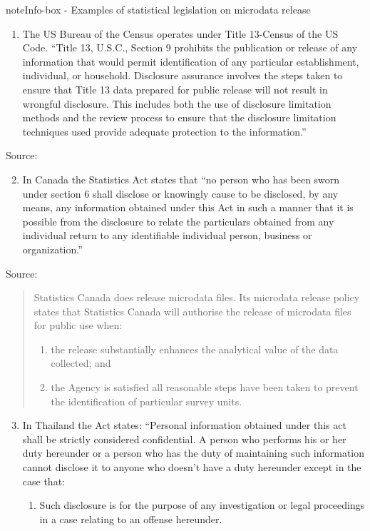 \documentclass[letterpaper,10pt,english]{sphinxmanual}
\begin{document}
\begin{sphinxadmonition}{note}{Info-box - Examples of statistical legislation on microdata release}
\begin{enumerate}
\item {} 
The US Bureau of the Census operates under Title 13-Census of the US Code. “Title 13, U.S.C., Section 9 prohibits the publication or release of any information that would permit identification of any particular establishment, individual, or household. Disclosure assurance involves the steps taken to ensure that Title 13 data prepared for public release will not result in wrongful disclosure. This includes both the use of disclosure limitation methods and the review process to ensure that the disclosure limitation techniques used provide adequate protection to the information.”

\end{enumerate}

Source: 
\begin{enumerate}
\setcounter{enumi}{1}
\item {} 
In Canada the Statistics Act states that “no person who has been sworn under section 6 shall disclose or knowingly cause to be disclosed, by any means, any information obtained under this Act in such a manner that it is possible from the disclosure to relate the particulars obtained from any individual return to any identifiable individual person, business or organization.”

\end{enumerate}

Source: 
\begin{quote}

Statistics Canada does release microdata files. Its microdata release policy states that Statistics Canada will authorise the release of microdata files for public use when:
\begin{enumerate}
\item {} 
the release substantially enhances the analytical value of the data collected; and

\item {} 
the Agency is satisfied all reasonable steps have been taken to prevent the identification of particular survey units.

\end{enumerate}
\end{quote}
\begin{enumerate}
\setcounter{enumi}{2}
\item {} 
In Thailand the Act states: “Personal information obtained under this act shall be strictly considered confidential. A person who performs his or her duty hereunder or a person who has the duty of maintaining such information cannot disclose it to anyone who doesn’t have a duty hereunder except in the case that:
\begin{enumerate}
\item {} 
Such disclosure is for the purpose of any investigation or legal proceedings in a case relating to an offense hereunder.


\end{enumerate}
\end{enumerate}
\end{sphinxadmonition}
\end{document}
